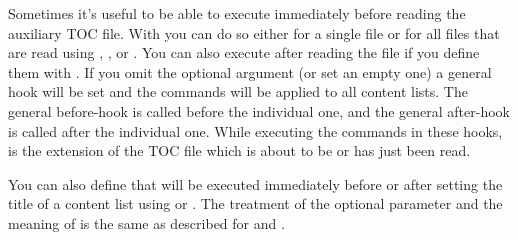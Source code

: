 \begin{Declaration}
\end{Declaration}
Sometimes it's useful to be able to execute  immediately
before reading the auxiliary TOC file. With  you can
do so either for a single file  or for all files that are
read using ,
, or .
You can also execute  after reading the file if you define
them with . If you omit the optional argument (or set
an empty one) a general hook will be set and the commands will be applied to
all content lists. The general before-hook is called before the individual
one, and the general after-hook is called after the individual one. While
executing the commands in these hooks,
 is the
extension of the TOC file which is about to be or has just been read.%
\EndIndexGroup


\begin{Declaration}
\end{Declaration}
You can also define  that will be executed immediately before
or after setting the title of a content list using
 or . The
treatment of the optional parameter and the meaning of
 is the same as
described for  and
.%
\EndIndexGroup


